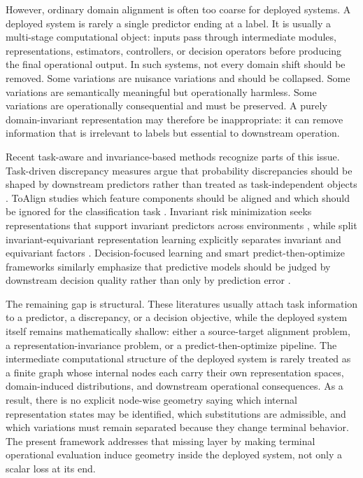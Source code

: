 \documentclass[10pt,twocolumn]{article}
\begin{document}
However, ordinary domain alignment is often too coarse for deployed systems. A deployed system is rarely a single predictor ending at a label. It is usually a multi-stage computational object: inputs pass through intermediate modules, representations, estimators, controllers, or decision operators before producing the final operational output. In such systems, not every domain shift should be removed. Some variations are nuisance variations and should be collapsed. Some variations are semantically meaningful but operationally harmless. Some variations are operationally consequential and must be preserved. A purely domain-invariant representation may therefore be inappropriate: it can remove information that is irrelevant to labels but essential to downstream operation.

Recent task-aware and invariance-based methods recognize parts of this issue. Task-driven discrepancy measures argue that probability discrepancies should be shaped by downstream predictors rather than treated as task-independent objects \citep{task_driven_discrepancy}. ToAlign studies which feature components should be aligned and which should be ignored for the classification task \citep{toalign}. Invariant risk minimization seeks representations that support invariant predictors across environments \citep{irm}, while split invariant-equivariant representation learning explicitly separates invariant and equivariant factors \citep{sie}. Decision-focused learning and smart predict-then-optimize frameworks similarly emphasize that predictive models should be judged by downstream decision quality rather than only by prediction error \citep{decision_focused_learning, smart_predict_then_optimize}.

The remaining gap is structural. These literatures usually attach task information to a predictor, a discrepancy, or a decision objective, while the deployed system itself remains mathematically shallow: either a source-target alignment problem, a representation-invariance problem, or a predict-then-optimize pipeline. The intermediate computational structure of the deployed system is rarely treated as a finite graph whose internal nodes each carry their own representation spaces, domain-induced distributions, and downstream operational consequences. As a result, there is no explicit node-wise geometry saying which internal representation states may be identified, which substitutions are admissible, and which variations must remain separated because they change terminal behavior. The present framework addresses that missing layer by making terminal operational evaluation induce geometry inside the deployed system, not only a scalar loss at its end.
\end{document}
